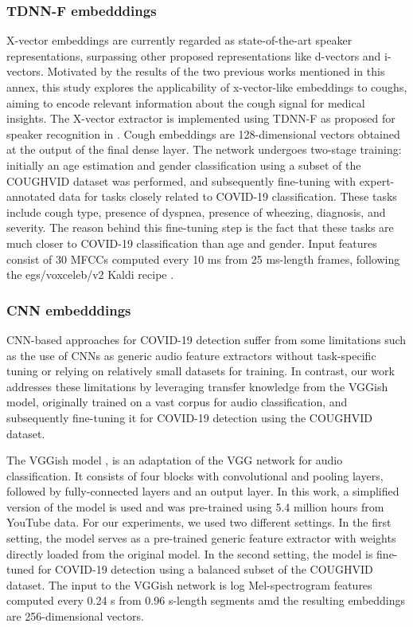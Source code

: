 \subsubsection{TDNN-F embedddings}
X-vector embeddings are currently regarded as state-of-the-art speaker representations, surpassing other proposed representations like d-vectors and i-vectors. Motivated by the results of the two previous works mentioned in this annex, this study explores the applicability of x-vector-like embeddings to coughs, aiming to encode relevant information about the cough signal for medical insights.
The X-vector extractor is implemented using \ac{TDNN-F} as proposed for speaker recognition in \cite{villalbaSRE182020}.  Cough embeddings are 128-dimensional vectors obtained at the output of the final dense layer. The network undergoes two-stage training: initially an age estimation and gender classification using a subset of the COUGHVID dataset was performed, and subsequently fine-tuning with expert-annotated data for tasks closely related to COVID-19 classification. These tasks include cough type, presence of dyspnea, presence of wheezing, diagnosis, and severity. The reason behind this fine-tuning step is the fact that these tasks are much closer to COVID-19 classification than age and gender. Input features consist of 30 \acp{MFCC} computed every 10 ms from 25 ms-length frames, following the egs/voxceleb/v2 Kaldi recipe \cite{kaldi}.

\subsubsection{CNN embedddings}
\ac{CNN}-based approaches for COVID-19 detection suffer from some limitations such as the use of \acp{CNN} as generic audio feature extractors without task-specific tuning or relying on relatively small datasets for training. In contrast, our work addresses these limitations by leveraging transfer knowledge from the VGGish model, originally trained on a vast corpus for audio classification, and subsequently fine-tuning it for COVID-19 detection using the COUGHVID dataset.

The VGGish model \cite{Hershey2017},  is an adaptation of the VGG network \cite{Simonyan2015} for audio classification. It consists of four blocks with convolutional and pooling layers, followed by fully-connected layers and an output layer. In this work, a simplified version of the model is used and was pre-trained using 5.4 million hours from YouTube data. For our experiments, we used two different settings. In the first setting, the model serves as a pre-trained generic feature extractor with weights directly loaded from the original model. In the second setting, the model is fine-tuned for COVID-19 detection using a balanced subset of the COUGHVID dataset. The input to the VGGish network is log Mel-spectrogram features computed every 0.24 s from 0.96 s-length segments amd the resulting embeddings are 256-dimensional vectors.


